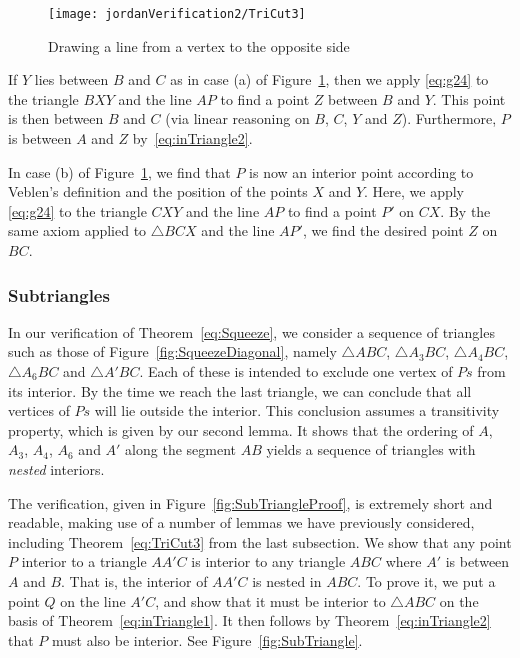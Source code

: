 \begin{figure}
\centering\texttt{[image: jordanVerification2/TriCut3]}
\caption{Drawing a line from a vertex to the opposite side}
\label{fig:TriCut3}
\end{figure}

If $Y$ lies between $B$ and $C$ as in case (a) of Figure~\ref{fig:TriCut3}, then we apply \eqref{eq:g24} to the triangle $BXY$ and the line $AP$ to find a point $Z$ between $B$ and $Y$. This point is then between $B$ and $C$ (via linear reasoning on $B$, $C$, $Y$ and $Z$). Furthermore, $P$ is between $A$ and $Z$ by~\eqref{eq:inTriangle2}.

In case (b) of Figure~\ref{fig:TriCut3}, we find that $P$ is now an interior point according to Veblen's definition and the position of the points $X$ and $Y$. Here, we apply \eqref{eq:g24} to the triangle $CXY$ and the line $AP$ to find a point $P'$ on $CX$. By the same axiom applied to $\triangle BCX$ and the line $AP'$, we find the desired point $Z$ on $BC$.

\subsubsection{Subtriangles}\label{sec:Subtriangles}
In our verification of Theorem~\ref{eq:Squeeze}, we consider a sequence of triangles such as those of Figure~\ref{fig:SqueezeDiagonal}, namely $\triangle ABC$, $\triangle A_3BC$, $\triangle A_4BC$, $\triangle A_6BC$ and $\triangle A'BC$. Each of these is intended to exclude one vertex of $Ps$ from its interior. By the time we reach the last triangle, we can conclude that all vertices of $Ps$ will lie outside the interior. This conclusion assumes a transitivity property, which is given by our second lemma. It shows that the ordering of $A$, $A_3$, $A_4$, $A_6$ and $A'$ along the segment $AB$ yields a sequence of triangles with \emph{nested} interiors. 

The verification, given in Figure~\ref{fig:SubTriangleProof}, is extremely short and readable, making use of a number of lemmas we have previously considered, including Theorem~\ref{eq:TriCut3} from the last subsection. We show that any point $P$ interior to a triangle $AA'C$ is interior to any triangle $ABC$ where $A'$ is between $A$ and $B$. That is, the interior of $AA'C$ is nested in $ABC$. To prove it, we put a point $Q$ on the line $A'C$, and show that it must be interior to $\triangle ABC$ on the basis of Theorem~\ref{eq:inTriangle1}. It then follows by Theorem~\ref{eq:inTriangle2} that $P$ must also be interior. See Figure~\ref{fig:SubTriangle}.

